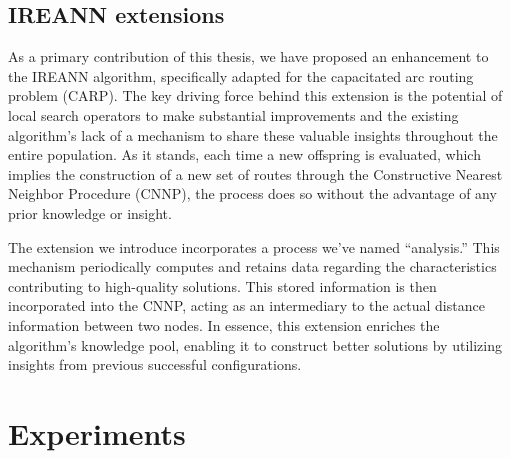 \documentclass[twoside]{ctuthesis}
\theoremstyle{plain}
\theoremstyle{definition}
\theoremstyle{note}
\begin{document}
\section{IREANN extensions}
\label{sec:extension}
As a primary contribution of this thesis, we have proposed an enhancement to the IREANN algorithm, specifically adapted for the capacitated arc routing problem (CARP). The key driving force behind this extension is the potential of local search operators to make substantial improvements and the existing algorithm's lack of a mechanism to share these valuable insights throughout the entire population. As it stands, each time a new offspring is evaluated, which implies the construction of a new set of routes through the Constructive Nearest Neighbor Procedure (CNNP), the process does so without the advantage of any prior knowledge or insight.

The extension we introduce incorporates a process we've named ``analysis.'' This mechanism periodically computes and retains data regarding the characteristics contributing to high-quality solutions. This stored information is then incorporated into the CNNP, acting as an intermediary to the actual distance information between two nodes. In essence, this extension enriches the algorithm's knowledge pool, enabling it to construct better solutions by utilizing insights from previous successful configurations.





\chapter{Experiments}






\end{document}
